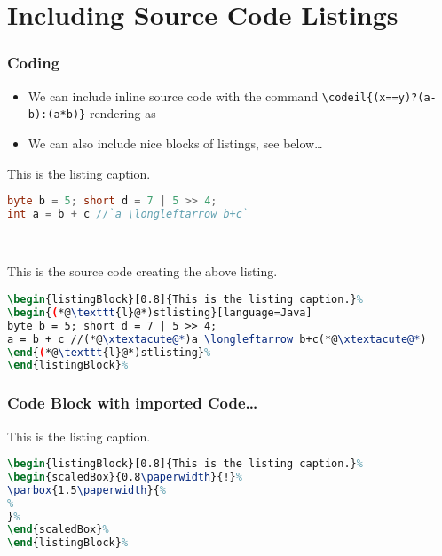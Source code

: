 \documentclass[mathserif]{beamer}%
\begin{document}
\section{Including Source Code Listings}%
%
\begin{frame}[containsverbatim]%
\frametitle{Coding}%
\begin{itemize}%
\item We can include inline source code with the command \texttt{{\textbackslash}codeil\{(x==y)?(a-b):(a*b)\}} rendering as %
\item We can also include nice blocks of listings, see below\dots%
\end{itemize}%
\begin{center}%
\begin{listingBlock}[0.8]{This is the listing caption.}%
\begin{lstlisting}[language=Java]
byte b = 5; short d = 7 | 5 >> 4;
int a = b + c //`a \longleftarrow b+c`
\end{lstlisting}%
\end{listingBlock}\\%
\def\xtextacute{\texttt{\` }}%
\begin{listingBlock}[0.8]{This is the source code creating the above listing.}%
\begin{lstlisting}[language=TeX]
\begin{listingBlock}[0.8]{This is the listing caption.}%
\begin{(*@\texttt{l}@*)stlisting}[language=Java]
byte b = 5; short d = 7 | 5 >> 4;
a = b + c //(*@\xtextacute@*)a \longleftarrow b+c(*@\xtextacute@*)
\end{(*@\texttt{l}@*)stlisting}%
\end{listingBlock}%
\end{lstlisting}%
\end{listingBlock}%
\end{center}%
\end{frame}%
%
%
\begin{frame}[containsverbatim]%
\frametitle{Code Block with imported Code\dots}%
\begin{center}%
\begin{listingBlock}[0.9]{This is the listing caption.}%
\begin{lstlisting}[language=TeX]
\begin{listingBlock}[0.8]{This is the listing caption.}%
\begin{scaledBox}{0.8\paperwidth}{!}%
\parbox{1.5\paperwidth}{%
%
}%
\end{scaledBox}%
\end{listingBlock}%
\end{lstlisting}%
\end{listingBlock}%
\end{center}%
\end{frame}%
\end{document}

